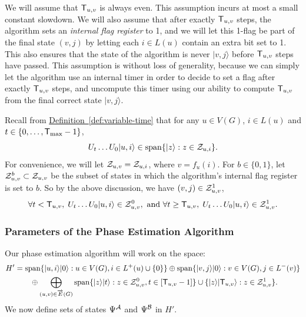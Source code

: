 \documentclass{article}
\newcommand{\defin}[1]{\hyperref[def:#1]{Definition~\ref*{def:#1}}}
\def\ket#1{{\lvert}#1\rangle}
\renewcommand{\>}{\rangle}
\newcommand{\<}{\langle}
\renewcommand{\(}{\left(}
\renewcommand{\)}{\right)}
\begin{document}
We will assume that ${\sf T}_{u,v}$ is always even. This assumption incurs at most a small constant slowdown. We will also assume that after exactly ${\sf T}_{u,v}$ steps, the algorithm sets an \emph{internal flag register} to 1, and we will let this 1-flag be part of the final state $(v,j)$ by letting each $i\in L(u)$ contain an extra bit set to 1. This also ensures that the state of the algorithm is never $\ket{v,j}$ before ${\sf T}_{u,v}$ steps have passed. This assumption is without loss of generality, because we can simply let the algorithm use an internal timer in order to decide to set a flag after exactly ${\sf T}_{u,v}$ steps, and uncompute this timer using our ability to compute ${\sf T}_{u,v}$ from the final correct state $\ket{v,j}$. 

Recall from \defin{variable-time} that for any $u\in V(G)$, $i\in L(u)$ and $t\in\{0,\dots,{\sf T}_{\max}-1\}$, 
$$U_t\dots U_0\ket{u,i}\in \mathrm{span}\{\ket{z}:z\in {\cal Z}_{u,i}\}.$$ 
For convenience, we will let ${\cal Z}_{u,v}={\cal Z}_{u,i}$, where $v=f_u(i)$.
For $b\in\{0,1\}$, let ${\cal Z}_{u,v}^b\subset {\cal Z}_{u,v}$ be the subset of states in which the algorithm's internal flag register is set to $b$. So by the above discussion, we have $(v,j)\in {\cal Z}_{u,v}^1$,
$$\forall t<{\sf T}_{u,v},\; U_t\dots U_0\ket{u,i} \in {\cal Z}_{u,v}^0,
\mbox{ and }
\forall t\geq {\sf T}_{u,v},\;
U_t\dots U_0\ket{u,i} \in {\cal Z}_{u,v}^1.$$ 


\subsubsection{Parameters of the Phase Estimation Algorithm}

Our phase estimation algorithm will work on the space:
\begin{equation}
\begin{split}
H'&=\mathrm{span}\{\ket{u,i}\ket{0}:u\in V(G),i\in L^+(u)\cup\{0\}\}\oplus\mathrm{span}\{\ket{v,j}\ket{0}:v\in V(G),j\in L^-(v)\}\\
&\qquad\oplus\bigoplus_{(u,v)\in\overrightarrow{E}(G)}\mathrm{span}\{\ket{z}\ket{t}:z\in{\cal Z}_{u,v}^0,t\in[{\sf T}_{u,v}-1]\}\cup\{\ket{z}\ket{{\sf T}_{u,v}}:z\in{\cal Z}_{u,v}^1\}.
\end{split}\label{eq:full-fwk-H}
\end{equation}
We now define sets of states $\Psi^{\cal A}$ and $\Psi^{\cal B}$ in $H'$.
\end{document}
